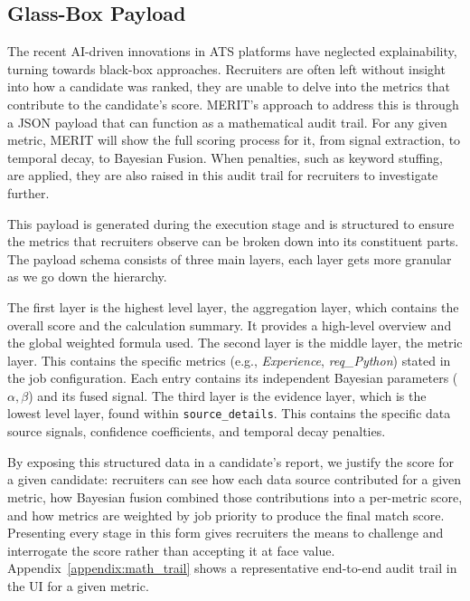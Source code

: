 \subsection{Glass-Box Payload}
The recent AI-driven innovations in ATS platforms have neglected explainability, turning towards
black-box approaches. Recruiters are often left without insight into how a candidate was ranked, they are unable to delve 
into the metrics that contribute to the candidate's score. MERIT's approach to address this is through a JSON payload that
can function as a mathematical audit trail. For any given metric, MERIT will show the full scoring process for it, from signal extraction,
to temporal decay, to Bayesian Fusion. When penalties, such as keyword stuffing, are applied, they are also raised in
this audit trail for recruiters to investigate further. 

This payload is generated during the execution stage and is structured to ensure the metrics that recruiters
observe can be broken down into its constituent parts. The payload schema consists of three main layers,
each layer gets more granular as we go down the hierarchy.

The first layer is the highest level layer, the aggregation layer, which contains the overall score and the
calculation summary. It provides a high-level overview and the global weighted formula used. 
The second layer is the middle layer, the metric layer. This contains the specific metrics
(e.g., \textit{Experience}, \textit{req\_Python}) stated in the job configuration. Each entry contains its independent
Bayesian parameters ($\alpha, \beta$) and its fused signal. The third layer is the evidence layer,
which is the lowest level layer, found within \texttt{source\_details}. This contains the
specific data source signals, confidence coefficients, and temporal decay penalties.

By exposing this structured data in a candidate's report, we justify the score for a given candidate: recruiters
can see how each data source contributed for a given metric, how Bayesian fusion combined those contributions into
a per-metric score, and how metrics are weighted by job priority to produce the final match score. Presenting every
stage in this form gives recruiters the means to challenge and interrogate the score rather than accepting it at
face value. Appendix~\ref{appendix:math_trail} shows a representative 
end-to-end audit trail in the UI for a given metric.
